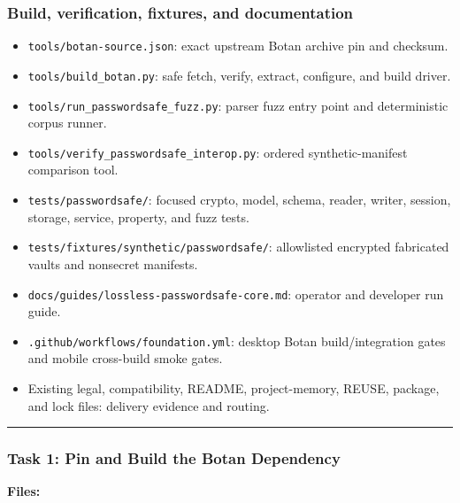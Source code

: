 \documentclass[
  letterpaper,
]{article}
\providecommand{\tightlist}{%
  \setlength{\itemsep}{0pt}\setlength{\parskip}{0pt}}
\begin{document}
\subsubsection{Build, verification, fixtures, and documentation}\label{build-verification-fixtures-and-documentation}

\begin{itemize}
\tightlist
\item
  \nolinkurl{tools/botan-source.json}: exact upstream Botan archive pin and checksum.
\item
  \nolinkurl{tools/build_botan.py}: safe fetch, verify, extract, configure, and build driver.
\item
  \nolinkurl{tools/run_passwordsafe_fuzz.py}: parser fuzz entry point and deterministic corpus runner.
\item
  \nolinkurl{tools/verify_passwordsafe_interop.py}: ordered synthetic-manifest comparison tool.
\item
  \nolinkurl{tests/passwordsafe/}: focused crypto, model, schema, reader, writer, session, storage, service, property,
  and fuzz tests.
\item
  \nolinkurl{tests/fixtures/synthetic/passwordsafe/}: allowlisted encrypted fabricated vaults and nonsecret manifests.
\item
  \nolinkurl{docs/guides/lossless-passwordsafe-core.md}: operator and developer run guide.
\item
  \nolinkurl{.github/workflows/foundation.yml}: desktop Botan build/integration gates and mobile cross-build smoke
  gates.
\item
  Existing legal, compatibility, README, project-memory, REUSE, package, and lock files: delivery evidence and routing.
\end{itemize}

\begin{center}\rule{0.5\linewidth}{0.5pt}\end{center}

\subsubsection{Task 1: Pin and Build the Botan Dependency}\label{task-1-pin-and-build-the-botan-dependency}

\textbf{Files:}
\end{document}

